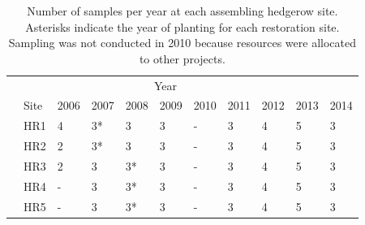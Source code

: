 \documentclass[12pt]{article}
\begin{document}
\doublespacing
\linenumbers

\renewcommand{\thesection}{S\arabic{section}} \setcounter{section}{0}
\renewcommand{\theequation}{S\arabic{equation}}
\setcounter{equation}{0} \renewcommand{\thetable}{S\arabic{table}}
\setcounter{table}{0} %
\renewcommand{\thefigure}{S\arabic{figure}} \setcounter{figure}{0}
\setcounter{page}{1}

\newcommand{\lkmcomment}[1] {
  \textcolor{red}{\it{[#1]}}
}


\begin{table}
  \renewcommand*\arraystretch{1.25}
  \centering
  \caption{Number of samples per year at each assembling hedgerow site. Asterisks indicate
    the year of planting for each restoration site. Sampling was not
    conducted in 2010 because resources were allocated to other
    projects.} 
  \begin{tabular}{lllllllllll}
    \hline
    \multicolumn{10}{c}{\hspace{10em}Year}\\
    & Site & 2006 & 2007 & 2008 & 2009 & 2010 & 2011 & 2012 & 2013 & 2014\\
    \hline
    &HR1 & 4 & 3* & 3 & 3 & - & 3 & 4 & 5 & 3 \\ 
    &HR2 & 2 & 3* & 3 & 3 & - & 3 & 4 & 5 & 3 \\
    &HR3 & 2 & 3 & 3* & 3 & - & 3 & 4 & 5 & 3 \\
    &HR4 & - & 3 & 3* & 3 & - & 3 & 4 & 5 & 3 \\
    &HR5 & - & 3 & 3* & 3 & - & 3 & 4 & 5 & 3 \\
    \hline
  \end{tabular}
  \label{tab:maturing}
\end{table}
\clearpage
\end{document}
